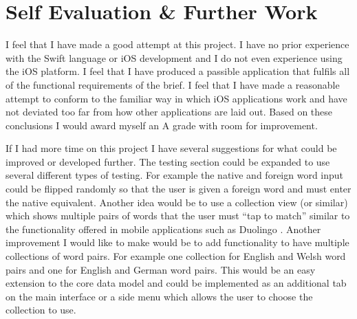 \documentclass[paper=a4, fontsize=11pt]{scrartcl}	%
\numberwithin{equation}{section}															%
\numberwithin{figure}{section}																%
\numberwithin{table}{section}
\begin{document}
\section{Self Evaluation \& Further Work}
I feel that I have made a good attempt at this project. I have no prior experience with the Swift language or iOS development and I do not even experience using the iOS platform. I feel that I have produced a passible application that fulfils all of the functional requirements of the brief. I feel that I have made a reasonable attempt to conform to the familiar way in which iOS applications work and have not deviated too far from how other applications are laid out. Based on these conclusions I would award myself an A grade with room for improvement.

If I had more time on this project I have several suggestions for what could be improved or developed further. The testing section could be expanded to use several different types of testing. For example the native and foreign word input could be flipped randomly so that the user is given a foreign word and must enter the native equivalent. Another idea would be to use a collection view (or similar) which shows multiple pairs of words that the user must ``tap to match'' similar to the functionality offered in mobile applications such as Duolingo \cite{duolingo}. Another improvement I would like to make would be to add functionality to have multiple collections of word pairs. For example one collection for English and Welsh word pairs and one for English and German word pairs. This would be an easy extension to the core data model and could be implemented as an additional tab on the main interface or a side menu which allows the user to choose the collection to use. 

\clearpage
\end{document}
